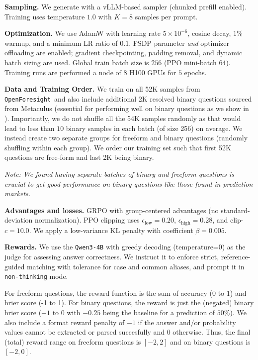 \documentclass{article} %
\newcommand{\ourdataset}{\texttt{OpenForesight}}
\begin{document}
\textbf{Sampling.} We generate with a vLLM-based sampler (chunked prefill enabled). Training uses temperature $1.0$ with $K{=}8$ samples per prompt. %

\textbf{Optimization.} We use AdamW \citep{loshchilov2017fixing} with learning rate $5{\times}10^{-6}$, cosine decay, $1\%$ warmup, and a minimum LR ratio of $0.1$. FSDP parameter \emph{and} optimizer offloading are enabled; gradient checkpointing, padding removal, and dynamic batch sizing are used. Global train batch size is $256$ (PPO mini-batch $64$). Training runs are performed a node of $8$ H100 GPUs for $5$ epochs.

\textbf{Data and Training Order.} We train on all 52K samples from \ourdataset \ and also include additional 2K resolved binary questions sourced from Metaculus (essential for performing well on binary questions as we show in ). Importantly, we do not shuffle all the 54K samples randomly as that would lead to less than $10$ binary samples in each batch (of size 256) on average. We instead create two separate groups for freeform and binary questions (randomly shuffling within each group). We order our training set such that first 52K questions are free-form and last 2K being binary. %

\emph{{Note:} We found having separate batches of binary and freeform questions is {crucial} to get good performance on binary questions like those found in prediction markets.}

\textbf{Advantages and losses.} GRPO with group-centered advantages (no standard-deviation normalization). PPO clipping uses $\epsilon_{\text{low}}{=}0.20$, $\epsilon_{\text{high}}{=}0.28$, and clip-$c{=}10.0$. We apply a low-variance KL penalty with coefficient $\beta{=}0.005$.

\textbf{Rewards.} We use the \texttt{Qwen3-4B} with greedy decoding (temperature=0) as the judge for assessing answer correctness. We instruct it to enforce strict, reference-guided matching with tolerance for case and common aliases, and prompt it in \texttt{non-thinking} mode. 

For freeform questions, the reward function is the sum of accuracy (0 to 1) and brier score (-1 to 1). For binary questions, the reward is just the (negated) binary brier score ($-1$ to $0$ with $-0.25$ being the baseline for a prediction of $50\%$). We also include a format reward penalty of $-1$ if the answer and/or probability values cannot be extracted or parsed succesfully and $0$ otherwise. Thus, the final (total) reward range on freeform questions is $[-2, 2]$ and on binary questions is $[-2, 0]$.
\end{document}
